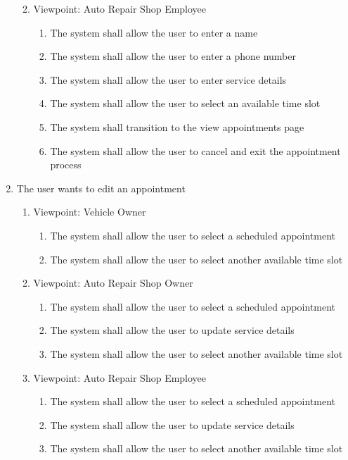 \documentclass[12pt]{article}
\begin{document}
\begin{enumerate}[resume*=business_events]
\begin{enumerate}[VP\arabic*.]
\begin{enumerate}
		            \end{enumerate}
		      \item Viewpoint: Auto Repair Shop Employee
		            \begin{enumerate}
			            \item The system shall allow the user to enter a name
			            \item The system shall allow the user to enter a phone number
			            \item The system shall allow the user to enter service details
			            \item The system shall allow the user to select an available time slot
			            \item The system shall transition to the view appointments page
			            \item The system shall allow the user to cancel and exit the appointment process
		            \end{enumerate}
	      \end{enumerate}

	\item The user wants to edit an appointment
	      \begin{enumerate}[VP\arabic*.]
		      \item Viewpoint: Vehicle Owner
		            \begin{enumerate}
			            \item The system shall allow the user to select a scheduled appointment
			            \item The system shall allow the user to select another available time slot
		            \end{enumerate}
		      \item Viewpoint: Auto Repair Shop Owner
		            \begin{enumerate}
			            \item The system shall allow the user to select a scheduled appointment
			            \item The system shall allow the user to update service details
			            \item The system shall allow the user to select another available time slot
		            \end{enumerate}
		      \item Viewpoint: Auto Repair Shop Employee
		            \begin{enumerate}
			            \item The system shall allow the user to select a scheduled appointment
			            \item The system shall allow the user to update service details
			            \item The system shall allow the user to select another available time slot
		            \end{enumerate}
	      \end{enumerate}


\end{enumerate}
\end{document}

